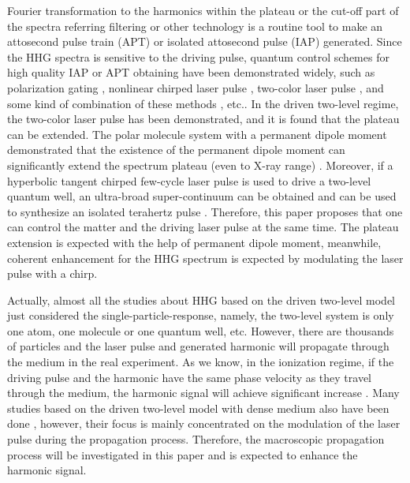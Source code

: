\documentclass[10pt,letterpaper]{article}
\begin{document}
Fourier transformation to the harmonics within the plateau or the cut-off part of the spectra referring filtering or other technology is a routine tool to make an attosecond pulse train (APT) or isolated attosecond pulse (IAP) generated. Since the HHG spectra is sensitive to the driving pulse, quantum control schemes for high quality IAP or APT obtaining have been demonstrated widely, such as polarization gating \cite{Corkum-PRL-1993,Sansone-Polarization-gate-Nature-2006}, nonlinear chirped laser pulse \cite{Carrera-Chirp-PRA-2007}, two-color laser pulse \cite{ZengZhinan-Two-Color-PRL-2007}, and some kind of combination of these methods \cite{ChangZenghu-Combination-PRA-2007}, etc.. In the driven two-level regime, the two-color laser pulse \cite{Gong-Two-Level-Two-Color-JMO-1999,WANG-ZHONG-YANG-Two-Level-Attosecond-generation-1999,LiuChengpu-Two-Level-PRA-2004} has been demonstrated, and it is found that the plateau can be extended. The polar molecule system with a permanent dipole moment demonstrated that the existence of the permanent dipole moment can significantly extend the spectrum plateau (even to X-ray range) \cite{YangWeifeng-Two-Level-PLA-2007}. Moreover, if a hyperbolic tangent chirped few-cycle laser pulse is used to drive a two-level quantum well, an ultra-broad super-continuum can be obtained and can be used to synthesize an isolated terahertz pulse \cite{CuiNi2010NJP-wavelet}. Therefore, this paper proposes that one can control the matter and the driving laser pulse at the same time. The plateau extension is expected with the help of permanent dipole moment, meanwhile, coherent enhancement for the HHG spectrum is expected by modulating the laser pulse with a chirp.

Actually, almost all the studies about HHG based on the driven two-level model just considered the single-particle-response, namely, the two-level system is only one atom, one molecule or one quantum well, etc. However, there are thousands of particles and the laser pulse and generated harmonic will propagate through the medium in the real experiment. As we know, in the ionization regime, if the driving pulse and the harmonic have the same phase velocity as they travel through the medium, the harmonic signal will achieve significant increase \cite{2009Review}. Many studies based on the driven two-level model with dense medium also have been done \cite{Kalosha-Two-Level-PRL-1999,Xiao-Jian-PRA-2002,Xia-Keyu-OE-2005,Pan-Ruiqin-Permanent-dipole-moment-2011,Ziolkowski-Two-Level-Method-PRA-1995}, however, their focus is mainly concentrated on the modulation of the laser pulse during the propagation process. Therefore, the macroscopic propagation process will be investigated in this paper and is expected to enhance the harmonic signal.
\end{document}
